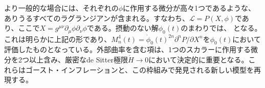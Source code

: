 より一般的な場合には、それぞれの$\phi$に作用する微分が高々1つであるような、ありうるすべてのラグランジアンが含まれる。すなわち、$\mathcal{L}=P(X,\phi)$であり、ここで$X=g^{\mu\nu}\partial_\mu\phi\partial_\nu\phi$である。摂動のない解$\phi_0(t)$のまわりでは、
となる。これは明らかに上記の形であり、$M_n^4(t)=\dot\phi_0(t)^{2n}\partial^nP/\partial X^n$を$\phi_0(t)$において評価したものとなっている。外部曲率を含む項は、1つのスカラーに作用する微分を2つ以上含み、厳密なde Sitter極限$\dot H\to0$において決定的に重要となる。これらはゴースト・インフレーションと、この枠組みで発見される新しい模型を再現する。
